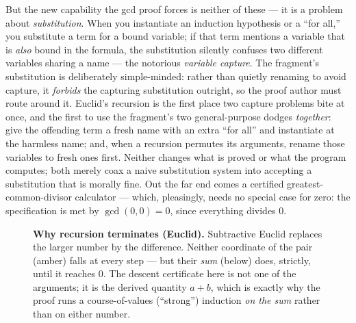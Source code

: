 \documentclass[11pt]{article}
\begin{document}
But the new capability the gcd proof forces is neither of these --- it is a
problem about \emph{substitution}. When you instantiate an induction hypothesis
or a ``for all,'' you substitute a term for a bound variable; if that term
mentions a variable that is \emph{also} bound in the formula, the substitution
silently confuses two different variables sharing a name --- the notorious
\emph{variable capture}. The fragment's substitution is deliberately
simple-minded: rather than quietly renaming to avoid capture, it \emph{forbids}
the capturing substitution outright, so the proof author must route around it.
Euclid's recursion is the first place two capture problems bite at once, and the
first to use the fragment's two general-purpose dodges \emph{together}: give the
offending term a fresh name with an extra ``for all'' and instantiate at the
harmless name; and, when a recursion permutes its arguments, rename those
variables to fresh ones first. Neither changes what is proved or what the
program computes; both merely coax a naive substitution system into accepting a
substitution that is morally fine. Out the far end comes a certified
greatest-common-divisor calculator --- which, pleasingly, needs no special case
for zero: the specification is met by $\gcd(0,0)=0$, since everything divides
$0$.

\begin{figure}[h]
\centering
{}
\caption{\textbf{Why recursion terminates (Euclid).} Subtractive Euclid replaces
the larger number by the difference. Neither coordinate of the pair (amber)
falls at every step --- but their \emph{sum} (below) does, strictly, until it
reaches $0$. The descent certificate here is not one of the arguments; it is the
derived quantity $a+b$, which is exactly why the proof runs a course-of-values
(``strong'') induction \emph{on the sum} rather than on either number.}
\label{fig:desc-euclid}
\end{figure}
\end{document}
